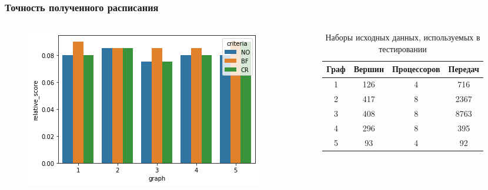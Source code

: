 \begin{frame}
    \frametitle{Точность полученного расписания}
    \begin{columns}
        \begin{column}{0.5\textwidth}
            \begin{figure}
                \includegraphics[width=\textwidth]{imgs/relative_score.png}
            \end{figure}
        \end{column}
        \begin{column}{0.5\textwidth}
            \begin{table}
                \caption*{Наборы исходных данных, используемых в тестировании}
                \begin{tabular}{c | c | c | c}
                    Граф & Вершин & Процессоров & Передач \\
                    \hline
                    1    & 126    & 4           & 716     \\
                    2    & 417    & 8           & 2367    \\
                    3    & 408    & 8           & 8763    \\
                    4    & 296    & 8           & 395     \\
                    5    & 93     & 4           & 92      \\
                \end{tabular}
            \end{table}
        \end{column}
    \end{columns}


\end{frame}
